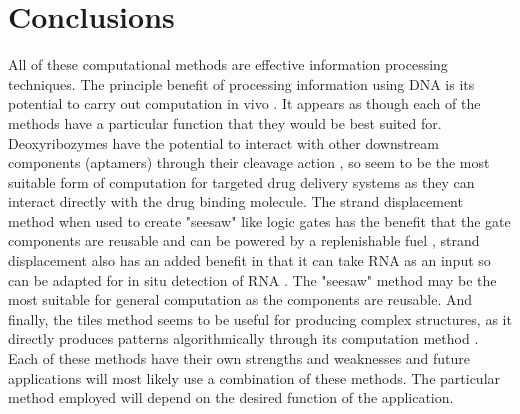 \documentclass[11pt,a4paper,portrait]{article}
\begin{document}
\section{Conclusions}
All of these computational methods are effective information processing techniques. The principle benefit of processing information using DNA is its potential to carry out computation in vivo \cite{Ezziane06}. It appears as though each of the methods have a particular function that they would be best suited for. Deoxyribozymes have the potential to interact with other downstream components (aptamers) through their cleavage action \cite{Aptamer}, so seem to be the most suitable form of computation for targeted drug delivery systems as they can interact directly with the drug binding molecule. The strand displacement method when used to create "seesaw" like logic gates has the benefit that the gate components are reusable and can be powered by a replenishable fuel \cite{Qian11}, strand displacement also has an added benefit in that it can take RNA as an input so can be adapted for in situ detection of RNA \cite{enzymefree}. The "seesaw" method may be the most suitable for general computation as the components are reusable. And finally, the tiles method seems to be useful for producing complex structures, as it directly produces patterns algorithmically through its computation method \cite{Tiles00}. Each of these methods have their own strengths and weaknesses and future applications will most likely use a combination of these methods. The particular method employed will depend on the desired function of the application. 
\clearpage
\printbibliography
\end{document}
